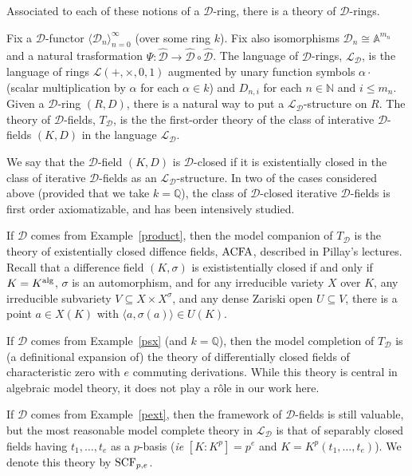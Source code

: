 \documentclass{amsart}
\newcommand{\ACFA}{{\rm ACFA}}
\newcommand{\SCF}{{\rm SCF}}
\newcommand{\NN}{{\mathbb N}}
\newcommand{\QQ}{{\mathbb Q}}
\newcommand{\cD}{{\mathcal D}}
\newcommand{\cL}{{\mathcal L}}
\newcommand{\alg}{{\rm alg}}
\theoremstyle{definition}
\theoremstyle{remark}
\begin{document}
Associated to each of these notions of a $\cD$-ring, there is a theory of $\cD$-rings.


Fix a $\cD$-functor $\langle \cD_n \rangle_{n=0}^\infty$ (over some ring $k$). 
Fix also isomorphisms $\cD_n \cong {\mathbb A}^{m_n}$ and 
a natural trasformation $\Psi: \widehat{\cD} \to \widehat{\cD} \circ \widehat{\cD}$.
The language of $\cD$-rings, $\cL_{\cD}$, is the language of rings $\cL(+, \times, 0, 1)$ augmented by 
unary function symbols $\alpha \cdot$ (scalar multiplication by $\alpha$ for 
each $\alpha \in k$) and $D_{n,i}$ for each $n \in \NN$ and $i \leq m_n$.   
Given a $\cD$-ring $(R,D)$, there is a natural way to put a $\cL_\cD$-structure on $R$.
The theory of $\cD$-fields, $T_\cD$, is the the first-order theory of the class of interative $\cD$-fields $(K,D)$
in the language $\cL_\cD$.  

We say that the $\cD$-field $(K,D)$ is $\cD$-closed if it is 
existentially closed in the class of iterative $\cD$-fields as an $\cL_\cD$-structure.
In two of the cases considered above (provided that we take $k = \QQ$),
the class of $\cD$-closed iterative 
$\cD$-fields is first order axiomatizable, and has been intensively studied.  


If $\cD$ comes from Example~\ref{product}, then the model companion of $T_\cD$ is the 
theory of existentially closed diffence fields, $\ACFA$, described in Pillay's lectures.  Recall that
a difference field $(K,\sigma)$ is exististentially closed if and only if $K = K^\alg$, $\sigma$ is an 
automorphism, and for any irreducible variety $X$ over $K$, any irreducible subvariety 
$V  \subseteq X \times X^\sigma$, and any dense Zariski open $U \subseteq V$, there is a 
point $a \in X(K)$ with $\langle a, \sigma(a) \rangle \in U(K)$.  


If $\cD$ comes from Example~\ref{psx} (and $k = \QQ$), then the model completion of $T_\cD$ is 
(a definitional expansion of) the theory of differentially closed fields 
of characteristic zero with $e$ commuting derivations.  While this theory is central in algebraic
model theory, it does not play a r\^{o}le in our work here.


If $\cD$ comes from Example~\ref{pext}, then the framework of $\cD$-fields is still valuable, but 
the most reasonable model complete theory in $\cL_\cD$ is that of separably closed fields 
having $t_1, \ldots, t_e$ as a $p$-basis (\emph{ie} $[K:K^p] = p^e$ and $K = K^p(t_1, \ldots, t_e)$). 
We denote this theory by $\SCF_{p,e}$.
\end{document}
